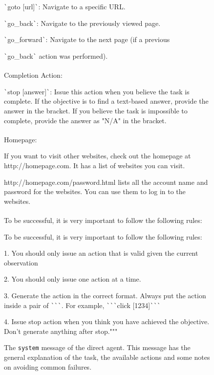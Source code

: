 \begin{figure}
{{\texttt{\`}goto [url]\texttt{\`}: Navigate to a specific URL.

\texttt{\`}go\_back\texttt{\`}: Navigate to the previously viewed page.

\texttt{\`}go\_forward\texttt{\`}: Navigate to the next page (if a previous 

\texttt{\`}go\_back\texttt{\`} action was performed).
\\~\\
Completion Action:

\texttt{\`}stop [answer]\texttt{\`}: Issue this action when you believe the task is complete. If the objective is to find a text-based answer, provide the answer in the bracket. If you believe the task is impossible to complete, provide the answer as "N/A" in the bracket.
\\~\\
Homepage:

If you want to visit other websites, check out the homepage at http://homepage.com. It has a list of websites you can visit.

http://homepage.com/password.html lists all the account name and password for the websites. You can use them to log in to the websites.
\\~\\
To be successful, it is very important to follow the following rules:

To be successful, it is very important to follow the following rules:

1. You should only issue an action that is valid given the current observation

2. You should only issue one action at a time.

3. Generate the action in the correct format. Always put the action inside a pair of \texttt{\`{}\`{}\`{}}. For example, \texttt{\`{}\`{}\`{}}click [1234]\texttt{\`{}\`{}\`{}}

4. Issue stop action when you think you have achieved the objective. Don't generate anything after stop."""
    }%
}
\caption{The \texttt{system} message of the direct agent. This message has the general explanation of the task, the available actions and some notes on avoiding common failures.}\label{fig:direct_prompt}
\end{figure}


